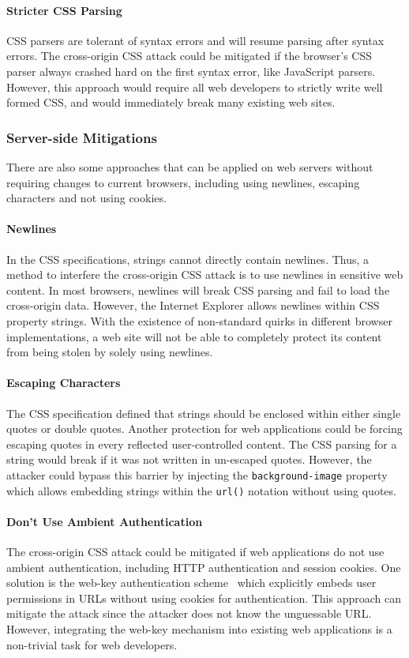 \documentclass{acm_proc_article-sp}
\begin{document}
\paragraph{Stricter CSS Parsing}
CSS parsers are tolerant of syntax errors and will resume parsing after syntax errors. The cross-origin CSS attack could be mitigated if the browser's CSS parser always crashed hard on the first syntax error, like JavaScript parsers. However, this approach would require all web developers to strictly write well formed CSS, and would immediately break many existing web sites.

\subsubsection{Server-side Mitigations}
There are also some approaches that can be applied on web servers without requiring changes to current browsers, including using newlines, escaping characters and not using cookies.

\paragraph{Newlines}
In the CSS specifications, strings cannot directly contain newlines. Thus, a method to interfere the cross-origin CSS attack is to use newlines in sensitive web content. In most browsers, newlines will break CSS parsing and fail to load the cross-origin data. However, the Internet Explorer allows newlines within CSS property strings. With the existence of non-standard quirks in different browser implementations, a web site will not be able to completely protect its content from being stolen by solely using newlines.

\paragraph{Escaping Characters}
The CSS specification defined that strings should be enclosed within either single quotes or double quotes. Another protection for web applications could be forcing escaping quotes in every reflected user-controlled content. The CSS parsing for a string would break if it was not written in un-escaped quotes. However, the attacker could bypass this barrier by injecting the \texttt{background-image} property which allows embedding strings within the \texttt{url()} notation without using quotes.

\paragraph{Don't Use Ambient Authentication}
The cross-origin CSS attack could be mitigated if web applications do not use ambient authentication, including HTTP authentication and session cookies. One solution is the web-key authentication scheme~\cite{webkey} which explicitly embeds user permissions in URLs without using cookies for authentication. This approach can mitigate the attack since the attacker does not know the unguessable URL. However, integrating the web-key mechanism into existing web applications is a non-trivial task for web developers.
\end{document}
